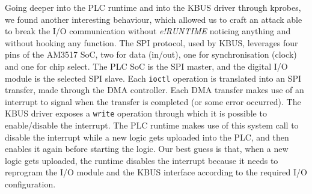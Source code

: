 Going deeper into the PLC runtime and into the KBUS driver through kprobes, we found another interesting behaviour, which allowed us to craft an attack able to break the I/O communication
without \emph{e!RUNTIME} noticing anything and without hooking any function. The SPI protocol, used by KBUS, leverages four pins of the AM3517 SoC, two for data (in/out),
one for synchronisation (clock) and one for chip select. The PLC SoC is the SPI master, and the digital I/O module is the selected SPI slave.
Each \verb|ioctl| operation is translated into an SPI transfer, made through the DMA controller. Each DMA transfer makes use of an interrupt to signal when the transfer
is completed (or some error occurred). The KBUS driver exposes a \verb|write| operation through which it is possible to enable/disable the interrupt.
The PLC runtime makes use of this system call to disable the interrupt while a new logic gets uploaded into the PLC, and then enables it again before starting the logic.
Our best guess is that, when a new logic gets uploaded, the runtime disables the interrupt because it needs to reprogram the I/O module and the KBUS interface according
to the required I/O configuration.

